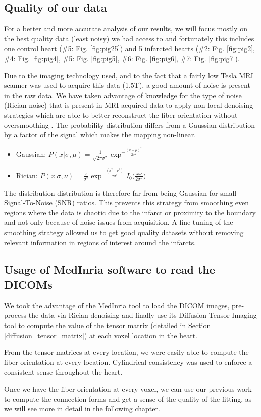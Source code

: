 \subsection{Quality of our data}

For a better and more accurate analysis of our results, we will focus mostly on the best quality data (least noisy) we had access to and fortunately this includes one control heart (\#5: Fig. \ref{fig:pig25}) and 5 infarcted hearts (\#2: Fig. \ref{fig:pig2}, \#4: Fig. \ref{fig:pig4}, \#5: Fig. \ref{fig:pig5}, \#6: Fig. \ref{fig:pig6}, \#7: Fig. \ref{fig:pig7}).

Due to the imaging technology used, and to the fact that a fairly low Tesla MRI scanner was used to acquire this data (1.5T), a good amount of noise is present in the raw data. We have taken advantage of knowledge for the type of noise (Rician noise) that is present in MRI-acquired data to apply non-local denoising strategies which are able to better reconstruct the fiber orientation without oversmoothing \cite{Basu2006RicianNR}. The probability distribution differs from a Gaussian distribution by a factor of the signal which makes the mapping non-linear.
\begin{itemize}
    \item Gaussian: $P(x | \sigma, \mu) = \frac{1}{\sqrt{2\pi\sigma^2}}\exp^{-\frac{(x - \mu)^2}{2\sigma^2}}$
    \item Rician: $P(x | \sigma, \nu) = \frac{x}{\sigma^2}\exp^{-\frac{(x^2 + \nu^2)}{2\sigma^2}}I_0\Big(\frac{x\nu}{2\sigma^2}\Big)$
\end{itemize}

The distribution distribution is therefore far from being Gaussian for small Signal-To-Noise (SNR) ratios. This prevents this strategy from smoothing even regions where the data is chaotic due to the infarct or proximity to the boundary and not only because of noise issues from acquisition. A fine tuning of the smoothing strategy allowed us to get good quality datasets without removing relevant information in regions of interest around the infarcts.

\subsection{Usage of MedInria software to read the DICOMs}

We took the advantage of the MedInria tool to load the DICOM images, pre-process the data via Rician denoising and finally use its Diffusion Tensor Imaging tool to compute the value of the tensor matrix (detailed in Section \ref{diffusion_tensor_matrix}) at each voxel location in the heart.

From the tensor matrices at every location, we were easily able to compute the fiber orientation at every location. Cylindrical consistency was used to enforce a consistent sense throughout the heart.

Once we have the fiber orientation at every voxel, we can use our previous work to compute the connection forms and get a sense of the quality of the fitting, as we will see more in detail in the following chapter.